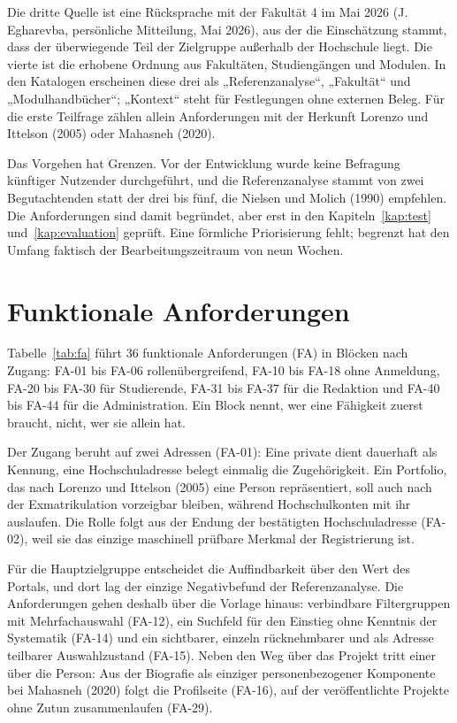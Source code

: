 Die dritte Quelle ist eine Rücksprache mit der Fakultät 4 im Mai 2026 (J. Egharevba, persönliche Mitteilung, Mai 2026), aus der die Einschätzung stammt, dass der überwiegende Teil der Zielgruppe außerhalb der Hochschule liegt. Die vierte ist die erhobene Ordnung aus Fakultäten, Studiengängen und Modulen. In den Katalogen erscheinen diese drei als „Referenzanalyse“, „Fakultät“ und „Modulhandbücher“; „Kontext“ steht für Festlegungen ohne externen Beleg. Für die erste Teilfrage zählen allein Anforderungen mit der Herkunft Lorenzo und Ittelson (2005) oder Mahasneh (2020).

Das Vorgehen hat Grenzen. Vor der Entwicklung wurde keine Befragung künftiger Nutzender durchgeführt, und die Referenzanalyse stammt von zwei Begutachtenden statt der drei bis fünf, die Nielsen und Molich (1990) empfehlen. Die Anforderungen sind damit begründet, aber erst in den Kapiteln~\ref{kap:test} und~\ref{kap:evaluation} geprüft. Eine förmliche Priorisierung fehlt; begrenzt hat den Umfang faktisch der Bearbeitungszeitraum von neun Wochen.

\section{Funktionale Anforderungen}
\label{sec:funktionale-anforderungen}

Tabelle~\ref{tab:fa} führt 36 funktionale Anforderungen (FA) in Blöcken nach Zugang: FA-01 bis FA-06 rollenübergreifend, FA-10 bis FA-18 ohne Anmeldung, FA-20 bis FA-30 für Studierende, FA-31 bis FA-37 für die Redaktion und FA-40 bis FA-44 für die Administration. Ein Block nennt, wer eine Fähigkeit zuerst braucht, nicht, wer sie allein hat.

Der Zugang beruht auf zwei Adressen (FA-01): Eine private dient dauerhaft als Kennung, eine Hochschuladresse belegt einmalig die Zugehörigkeit. Ein Portfolio, das nach Lorenzo und Ittelson (2005) eine Person repräsentiert, soll auch nach der Exmatrikulation vorzeigbar bleiben, während Hochschulkonten mit ihr auslaufen. Die Rolle folgt aus der Endung der bestätigten Hochschuladresse (FA-02), weil sie das einzige maschinell prüfbare Merkmal der Registrierung ist.

Für die Hauptzielgruppe entscheidet die Auffindbarkeit über den Wert des Portals, und dort lag der einzige Negativbefund der Referenzanalyse. Die Anforderungen gehen deshalb über die Vorlage hinaus: verbindbare Filtergruppen mit Mehrfachauswahl (FA-12), ein Suchfeld für den Einstieg ohne Kenntnis der Systematik (FA-14) und ein sichtbarer, einzeln rücknehmbarer und als Adresse teilbarer Auswahlzustand (FA-15). Neben den Weg über das Projekt tritt einer über die Person: Aus der Biografie als einziger personenbezogener Komponente bei Mahasneh (2020) folgt die Profilseite (FA-16), auf der veröffentlichte Projekte ohne Zutun zusammenlaufen (FA-29).

